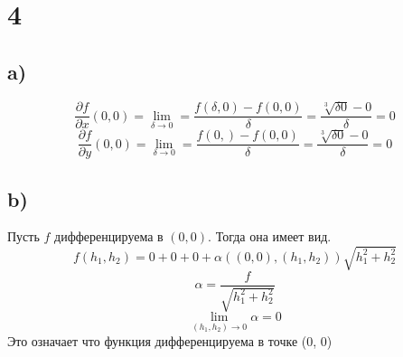 	\section*{4}
	\subsection*{a)}
	$$\frac{\partial f}{\partial x}(0,0) = \lim_{\delta \to 0} =\frac{f(\delta , 0) - f(0,0 )}{\delta } = \frac{\sqrt[3]{\delta0}- 0 }{\delta} = 0$$
	$$\frac{\partial f} {\partial y}(0,0) = \lim_{\delta \to 0} =\frac{f(0, ) - f(0,0 )}{\delta } = \frac{\sqrt[3]{\delta0}- 0 }{\delta} = 0$$
		\subsection*{b)}
		Пусть $f$ дифференцируема в $(0, 0)$.  Тогда она имеет вид. 
	$$f(h_1,h_2) = 0 + 0 + 0 + \alpha\left((0,0), (h_1,h_2)\right)\sqrt{h_1^2 + h_2^2}$$
	$$\alpha = \frac{f}{\sqrt{h_1^2 + h_2^2}}$$
	$$\lim\limits_{(h_1,h_2)\to 0} \alpha = 0$$ Это означает что функция дифференцируема в точке (0, 0)
	
